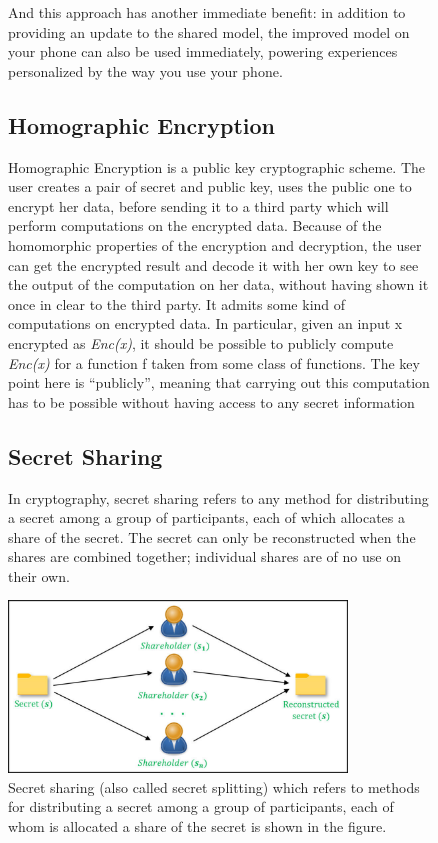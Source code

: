 \documentclass[conference]{IEEEtran}
\begin{document}
\begin{figure}

And this approach has another immediate benefit: in addition to providing an update to the shared model, the improved model on your phone can also be used immediately, powering experiences personalized by the way you use your phone.

\subsection{Homographic Encryption}
Homographic Encryption is a public key cryptographic scheme. The user creates a pair of secret and public key, uses the public one to encrypt her data, before sending it to a third party which will perform computations on the encrypted data. Because of the homomorphic properties of the encryption and decryption, the user can get the encrypted result and decode it with her own key to see the output of the computation on her data, without having shown it once in clear to the third party.
It admits some kind of computations on encrypted data. In particular, given an input x encrypted as  {\itshape Enc(x)}, it should be possible to publicly compute {\itshape Enc(x)} for a function f taken from some class of functions. The key point here is “publicly”, meaning that carrying out this computation has to be possible without having access to any secret information

\vspace{\baselineskip}

\subsection{ Secret Sharing }

In cryptography, secret sharing refers to any method for distributing a secret among a group of participants, each of which allocates a share of the secret. The secret can only be reconstructed when the shares are combined together; individual shares are of no use on their own.

\vspace{\baselineskip}
\vspace{\baselineskip}

\includegraphics[width=90mm,scale=0.7]{12.jpg}
\caption{Secret sharing (also called secret splitting) which refers to methods for distributing a secret among a group of participants, each of whom is allocated a share of the secret is shown in the figure. }
\end{figure}
\end{document}
